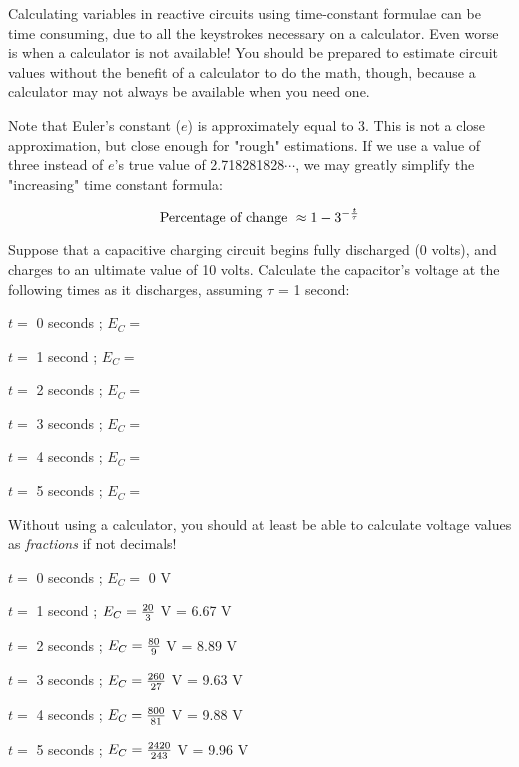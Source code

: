 

Calculating variables in reactive circuits using time-constant formulae can be time consuming, due to all the keystrokes necessary on a calculator.  Even worse is when a calculator is not available!  You should be prepared to estimate circuit values without the benefit of a calculator to do the math, though, because a calculator may not always be available when you need one.

Note that Euler's constant ($e$) is approximately equal to 3.  This is not a close approximation, but close enough for "rough" estimations.  If we use a value of three instead of $e$'s true value of 2.718281828$\cdots$, we may greatly simplify the "increasing" time constant formula:

$$\hbox{Percentage of change } \approx 1 - 3^{-{t \over \tau}}$$

Suppose that a capacitive charging circuit begins fully discharged (0 volts), and charges to an ultimate value of 10 volts.  Calculate the capacitor's voltage at the following times as it discharges, assuming $\tau$ = 1 second:

\medskip
\item{} $t =$ 0 seconds ; $E_C = $
\item{} $t =$ 1 second ; $E_C = $
\item{} $t =$ 2 seconds ; $E_C = $
\item{} $t =$ 3 seconds ; $E_C = $
\item{} $t =$ 4 seconds ; $E_C = $
\item{} $t =$ 5 seconds ; $E_C = $
\medskip

Without using a calculator, you should at least be able to calculate voltage values as {\it fractions} if not decimals!







\item{} $t =$ 0 seconds ; $E_C = $ 0 V
\item{} $t =$ 1 second ; $E_C = {20 \over 3}$ V = 6.67 V
\item{} $t =$ 2 seconds ; $E_C = {80 \over 9}$ V = 8.89 V 
\item{} $t =$ 3 seconds ; $E_C = {260 \over 27}$ V = 9.63 V
\item{} $t =$ 4 seconds ; $E_C = {800 \over 81}$ V = 9.88 V
\item{} $t =$ 5 seconds ; $E_C = {2420 \over 243}$ V = 9.96 V

